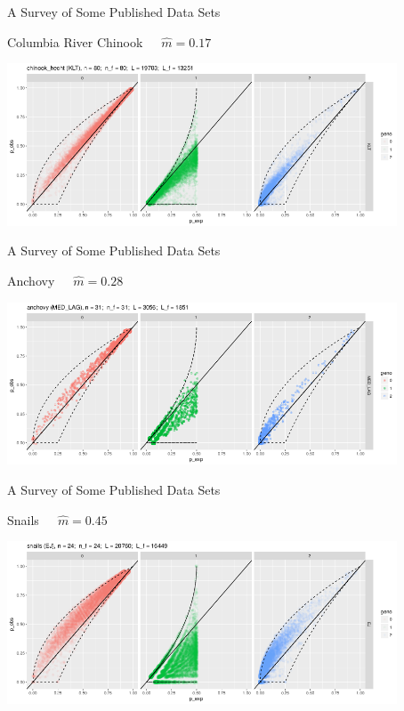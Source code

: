 \documentclass[letter,graphicx]{beamer}
\begin{document}
\begin{frame}{A Survey of Some Published Data Sets}

\begin{center}
Columbia River Chinook~~~$\hat{m} = 0.17$
\vspace*{1.5em}

\includegraphics[width=0.87\textwidth]{./images/chinook_hecht_big_pop.png}
\end{center}
\end{frame}




\begin{frame}{A Survey of Some Published Data Sets}

\begin{center}
Anchovy~~~$\hat{m} = 0.28$
\vspace*{1.5em}

\includegraphics[width=0.87\textwidth]{./images/anchovy_big_pop.png}
\end{center}
\end{frame}




\begin{frame}{A Survey of Some Published Data Sets}

\begin{center}
Snails~~~$\hat{m} = 0.45$
\vspace*{1.5em}

\includegraphics[width=0.87\textwidth]{./images/snails_big_pop.png}
\end{center}
\end{frame}
\end{document}
